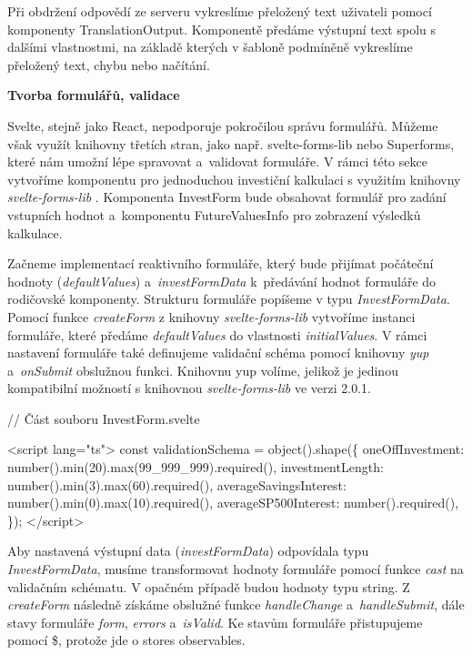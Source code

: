 Při obdržení odpovědí ze serveru vykreslíme přeložený text uživateli pomocí komponenty TranslationOutput. 
Komponentě předáme výstupní text spolu s dalšími vlastnostmi, na základě kterých v šabloně podmíněně vykreslíme přeložený text, chybu nebo načítání.

\begin{flushleft}
  \textbf{Tvorba formulářů, validace}
\end{flushleft}

Svelte, stejně jako React, nepodporuje pokročilou správu formulářů. Můžeme však využít knihovny třetích stran, jako např. svelte-forms-lib nebo Superforms, které nám umožní lépe spravovat a~validovat formuláře. 
V rámci této sekce vytvoříme komponentu pro jednoduchou investiční kalkulaci s využitím knihovny \emph{svelte-forms-lib} \cite{svelteformslib}. 
Komponenta InvestForm bude obsahovat formulář pro zadání vstupních hodnot a~komponentu FutureValuesInfo pro zobrazení výsledků kalkulace.

Začneme implementací reaktivního formuláře, který bude přijímat počáteční hodnoty (\emph{defaultValues}) a~\emph{investFormData} k~předávání hodnot formuláře do rodičovské komponenty. 
Strukturu formuláře popíšeme v typu \emph{InvestFormData}. Pomocí funkce \emph{createForm} z knihovny \emph{svelte-forms-lib} vytvoříme instanci formuláře, které předáme \emph{defaultValues} do vlastnosti \emph{initialValues}. 
V rámci nastavení formuláře také definujeme validační schéma pomocí knihovny \emph{yup} \cite{yuplibrary} a~\emph{onSubmit} obslužnou funkci. 
Knihovnu yup volíme, jelikož je jedinou kompatibilní možností s knihovnou \emph{svelte-forms-lib} ve verzi 2.0.1. 

\begin{prog}
// Část souboru InvestForm.svelte

<script lang="ts">
  const validationSchema = object().shape(\{
    oneOffInvestment: number().min(20).max(99_999_999).required(),
    investmentLength: number().min(3).max(60).required(),
    averageSavingsInterest: number().min(0).max(10).required(),
    averageSP500Interest: number().required(),
  \});
</script>
\end{prog}

Aby nastavená výstupní data (\emph{investFormData}) odpovídala typu \emph{InvestFormData}, musíme transformovat hodnoty formuláře pomocí funkce \emph{cast} na validačním schématu. V opačném případě budou hodnoty typu string. 
Z \emph{createForm} následně získáme obslužné funkce \emph{handleChange} a~\emph{handleSubmit}, dále stavy formuláře \emph{form}, \emph{errors} a~\emph{isValid}. Ke stavům formuláře přistupujeme pomocí \$, protože jde o stores observables.

